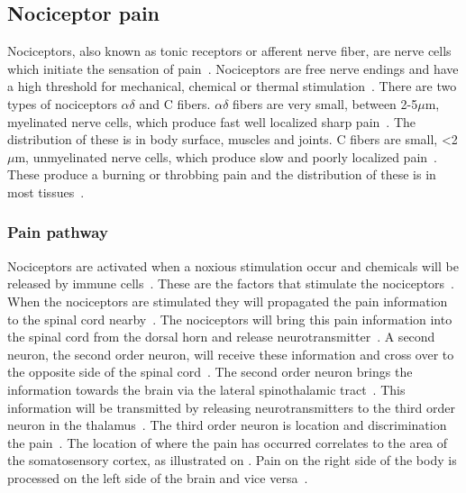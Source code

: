 \subsection{Nociceptor pain}
Nociceptors, also known as tonic receptors or afferent nerve fiber, are nerve cells which initiate the sensation of pain~\cite{Steeds2013, Martini2012}. Nociceptors are free nerve endings and have a high threshold for mechanical, chemical or thermal stimulation~\cite{Steeds2013}. There are two types of nociceptors $\alpha\delta$ and C fibers. $\alpha\delta$ fibers are very small, between 2-5$\mu$m, myelinated nerve cells, which produce fast well localized sharp pain~\cite{Steeds2013}. The distribution of these is in body surface, muscles and joints. C fibers are small, <2$\mu$m, unmyelinated nerve cells, which produce slow and poorly localized pain~\cite{Steeds2013}. These produce a burning or throbbing pain and the distribution of these is in most tissues~\cite{Steeds2013}. 

\subsubsection{Pain pathway}
Nociceptors are activated when a noxious stimulation occur and chemicals will be released by immune cells~\cite{Martini2012}. These are the factors that stimulate the nociceptors~\cite{Martini2012}. When the nociceptors are stimulated they will propagated the pain information to the spinal cord nearby~\cite{Martini2012}. The nociceptors will bring this pain information into the spinal cord from the dorsal horn and release neurotransmitter~\cite{Martini2012}. A second neuron, the second order neuron, will receive these information and cross over to the opposite side of the spinal cord~\cite{Martini2012}. The second order neuron brings the information towards the brain via the lateral spinothalamic tract~\cite{Martini2012}. This information will be transmitted by releasing neurotransmitters to the third order neuron in the thalamus~\cite{Martini2012}. The third order neuron is location and discrimination the pain~\cite{Martini2012}. The location of where the pain has occurred correlates to the area of the somatosensory cortex, as illustrated on . Pain on the right side of the body is processed on the left side of the brain and vice versa~\cite{Martini2012}. 

